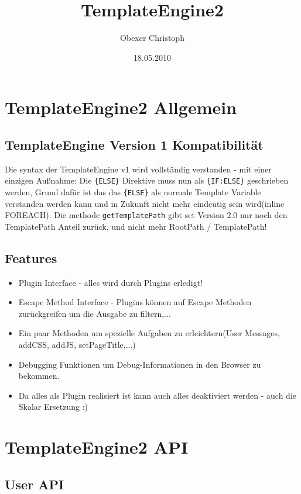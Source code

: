 \documentclass[a4paper,10pt]{article}
\title{TemplateEngine2}
\author{Obexer Christoph}
\date{18.05.2010}
\begin{document}
\maketitle
\pagebreak

\tableofcontents
\pagebreak

\section{TemplateEngine2 Allgemein}

\subsection{TemplateEngine Version 1 Kompatibilit\"at}
Die syntax der TemplateEngine v1 wird vollständig verstanden - mit einer einzigen Au\ss{}nahme:\newline
Die {\tt \{ELSE\}} Direktive muss nun als {\tt \{IF:ELSE\}} geschrieben werden, Grund daf\"ur ist
das das {\tt \{ELSE\}} als normale Template Variable verstanden werden kann und in Zukunft nicht mehr
eindeutig sein wird(inline FOREACH).\newline
Die methode {\tt getTemplatePath} gibt set Version 2.0 nur noch den TemplatePath Anteil zur\"uck, und nicht mehr
RootPath / TemplatePath!

\subsection{Features}
\begin{itemize}
	\item Plugin Interface - alles wird durch Plugins erledigt!
	\item Escape Method Interface - Plugins k\"onnen auf Escape Methoden zur\"uckgreifen um die Ausgabe zu filtern,...
	\item Ein paar Methoden um spezielle Aufgaben zu erleichtern(User Messages, addCSS, addJS, setPageTitle,...)
	\item Debugging Funktionen um Debug-Informationen in den Browser zu bekommen.
	\item Da alles als Plugin realisiert ist kann auch alles deaktiviert werden - auch die Skalar Ersetzung :)
\end{itemize}


\section{TemplateEngine2 API}

\subsection{User API}
\end{document}
